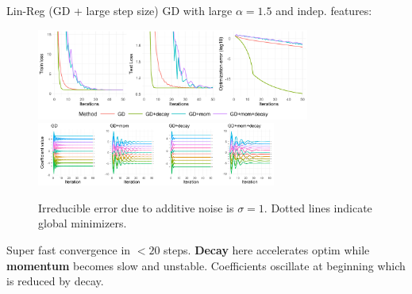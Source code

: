 \documentclass[11pt,compress,t,notes=noshow, xcolor=table]{beamer}
\begin{document}
\begin{vbframe}{Lin-Reg (GD + large step size)}
\vspace{-0.5cm}
GD with large $\alpha=1.5$ and indep. features:
\begin{figure}
            \includegraphics[width=0.8\textwidth]{figure_man/simu_linmod/GD_reg_large_lr_iters.pdf} \\
             \includegraphics[width=0.7\textwidth]{figure_man/simu_linmod/GD_reg_coef_large.pdf}\\
            \begin{footnotesize}
                Irreducible error due to additive noise is $\sigma=1$. Dotted lines indicate global minimizers.
            \end{footnotesize}
\end{figure}
Super fast convergence in $<20$ steps. \textbf{Decay} here accelerates optim while \textbf{momentum} becomes slow and unstable. Coefficients oscillate at beginning which is reduced by decay.
\end{vbframe}


\end{document}

